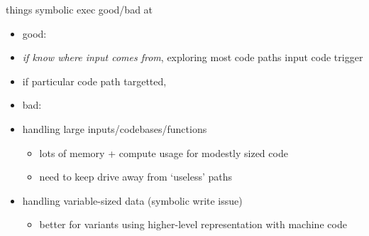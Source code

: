 
\begin{frame}{things symbolic exec good/bad at}
    \begin{itemize}
    \item good:
    \item \textit{if know where input comes from}, exploring most code paths input code trigger
    \item if particular code path targetted,  
    \item bad:
    \item handling large inputs/codebases/functions
        \begin{itemize}
        \item lots of memory + compute usage for modestly sized code
        \item need to keep drive away from `useless' paths
        \end{itemize}
    \item handling variable-sized data (symbolic write issue)
        \begin{itemize}
        \item better for variants using higher-level representation with machine code
        \end{itemize}
    \end{itemize}
\end{frame}
